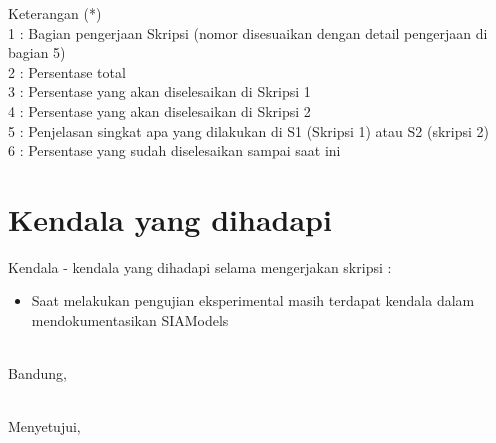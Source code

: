 \documentclass[a4paper,twoside]{article}
\begin{document}
Keterangan (*)\\
1 : Bagian pengerjaan Skripsi (nomor disesuaikan dengan detail pengerjaan di bagian 5)\\
2 : Persentase total \\
3 : Persentase yang akan diselesaikan di Skripsi 1 \\
4 : Persentase yang akan diselesaikan di Skripsi 2 \\
5 : Penjelasan singkat apa yang dilakukan di S1 (Skripsi 1) atau S2 (skripsi 2)\\
6 : Persentase yang sudah diselesaikan sampai saat ini 

\section{Kendala yang dihadapi}
Kendala - kendala yang dihadapi selama mengerjakan skripsi :
\begin{itemize}
	\item Saat melakukan pengujian eksperimental masih terdapat kendala dalam mendokumentasikan SIAModels\\\\
\end{itemize}

\vspace{1cm}
\centering Bandung, \tanggal\\
\vspace{2cm} \nama \\ 
\vspace{1cm}

Menyetujui, \\
\end{document}
